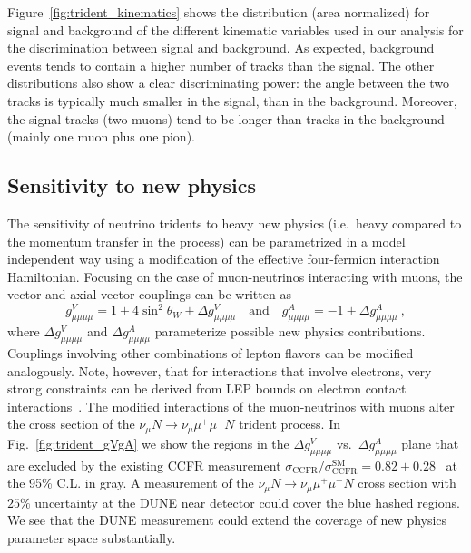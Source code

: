Figure~\ref{fig:trident_kinematics} shows the distribution (area normalized) for signal and background of the different kinematic variables used in our analysis for the discrimination between signal and background. As expected, background events tends to contain a higher number of tracks than the signal. The other distributions also show a clear discriminating power: the angle between the two tracks is typically much smaller in the signal, than in the background. Moreover, the signal tracks (two muons) tend to be longer than tracks in the background (mainly one muon plus one pion).

\subsection{Sensitivity to new physics}
The sensitivity of neutrino tridents to heavy new physics (i.e.\ heavy compared to the momentum transfer in the process) can be parametrized in a model independent way using a modification of the effective four-fermion interaction Hamiltonian. Focusing on the case of muon-neutrinos interacting with muons, the vector and axial-vector couplings can be written as
\begin{equation}
g_{\mu\mu\mu\mu}^V = 1 + 4 \sin^2\theta_W + \Delta g_{\mu\mu\mu\mu}^V \quad \mathrm{and} \quad g_{\mu\mu\mu\mu}^A = -1 + \Delta g_{\mu\mu\mu\mu}^A ~,
\end{equation}
where $\Delta g_{\mu\mu\mu\mu}^V$ and $\Delta g_{\mu\mu\mu\mu}^A$ parameterize possible new physics contributions. Couplings involving other combinations of lepton flavors can be modified analogously. Note, however, that for interactions that involve electrons, very strong constraints can be derived from LEP bounds on electron contact interactions~\cite{Schael:2013ita}. The modified interactions of the muon-neutrinos with muons alter the cross section of the $\nu_\mu N \to \nu_\mu \mu^+\mu^- N$ trident process. In Fig.~\ref{fig:trident_gVgA} we show the regions in the $\Delta g^V_{\mu\mu\mu\mu}$ vs.\ $\Delta g^A_{\mu\mu\mu\mu}$ plane that are excluded by the existing CCFR measurement $\sigma_\text{CCFR} / \sigma_\text{CCFR}^\text{SM} = 0.82 \pm 0.28$~\cite{Mishra:1991bv} at the 95\% C.L. in gray. A measurement of the $\nu_\mu N \to \nu_\mu \mu^+\mu^- N$ cross section with $25\%$ uncertainty at the DUNE near detector could cover the blue hashed regions. We see that the DUNE measurement could extend the coverage of new physics parameter space substantially.

